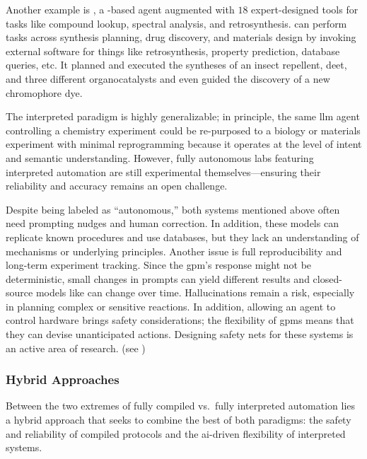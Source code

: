 Another example is  \autocite{bran2024augmenting}, a -based agent augmented with $18$ expert-designed tools for tasks like compound lookup, spectral analysis, and retrosynthesis.  can perform tasks across synthesis planning, drug discovery, and materials design by invoking external software for things like retrosynthesis, property prediction, database queries, etc. 
It planned and executed the syntheses of an insect repellent, \gls{deet}, and three different organocatalysts and even guided the discovery of a new chromophore dye. 

The interpreted paradigm is highly generalizable; in principle, the same \gls{llm} agent controlling a chemistry experiment could be re-purposed to a biology or materials experiment with minimal reprogramming because it operates at the level of intent and semantic understanding. 
However, fully autonomous labs featuring interpreted automation are still experimental themselves---ensuring their reliability and accuracy remains an open challenge. 

Despite being labeled as \enquote{autonomous,} both systems mentioned above often need prompting nudges and human correction. 
In addition, these models can replicate known procedures and use databases, but they lack an understanding of mechanisms or underlying principles. Another issue is full reproducibility and long-term experiment tracking. Since the \gls{gpm}'s response might not be deterministic, small changes in prompts can yield different results and closed-source models like  can change over time. 
Hallucinations remain a risk, especially in planning complex or sensitive reactions. 
In addition, allowing an agent to control hardware brings safety considerations; the flexibility of \glspl{gpm} means that they can devise unanticipated actions. Designing safety nets for these systems is an active area of research. (see )

\subsubsection{Hybrid Approaches}
Between the two extremes of fully compiled vs.\ fully interpreted automation lies a hybrid approach that seeks to combine the best of both paradigms: the safety and reliability of compiled protocols and the \gls{ai}-driven flexibility of interpreted systems. 

